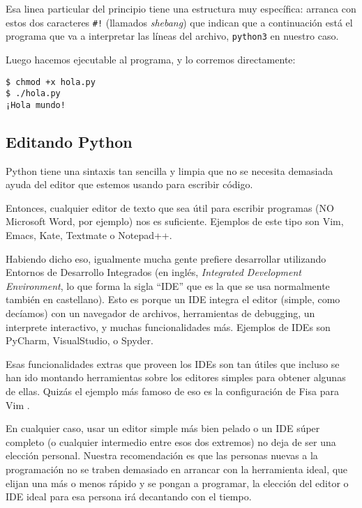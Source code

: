 
Esa linea particular del principio tiene una estructura muy específica: arranca con estos dos caracteres \verb|#!| (llamados \textit{shebang}) que indican que a continuación está el programa que va a interpretar las líneas del archivo, \texttt{python3} en nuestro caso.

Luego hacemos ejecutable al programa, y lo corremos directamente:

\begin{verbatim}
$ chmod +x hola.py
$ ./hola.py 
¡Hola mundo!
\end{verbatim}


\subsection{Editando Python}

Python tiene una sintaxis tan sencilla y limpia que no se necesita demasiada ayuda del editor que estemos usando para escribir código. 

Entonces, cualquier editor de texto que sea útil para escribir programas (NO Microsoft Word, por ejemplo) nos es suficiente. Ejemplos de este tipo son Vim, Emacs, Kate, Textmate o Notepad++.

Habiendo dicho eso, igualmente mucha gente prefiere desarrollar utilizando Entornos de Desarrollo Integrados (en inglés, \textit{Integrated Development Environment}, lo que forma la sigla ``IDE'' que es la que se usa normalmente también en castellano). Esto es porque un IDE integra el editor (simple, como decíamos) con un navegador de archivos, herramientas de debugging, un interprete interactivo, y muchas funcionalidades más. Ejemplos de IDEs son PyCharm, VisualStudio, o Spyder.

Esas funcionalidades extras que proveen los IDEs son tan útiles que incluso se han ido montando herramientas sobre los editores simples para obtener algunas de ellas. Quizás el ejemplo más famoso de eso es la configuración de Fisa para Vim \cite{fisavim}.

En cualquier caso, usar un editor simple más bien pelado o un IDE súper completo (o cualquier intermedio entre esos dos extremos) no deja de ser una elección personal. Nuestra recomendación es que las personas nuevas a la programación no se traben demasiado en arrancar con la herramienta ideal, que elijan una más o menos rápido y se pongan a programar, la elección del editor o IDE ideal para esa persona irá decantando con el tiempo.

